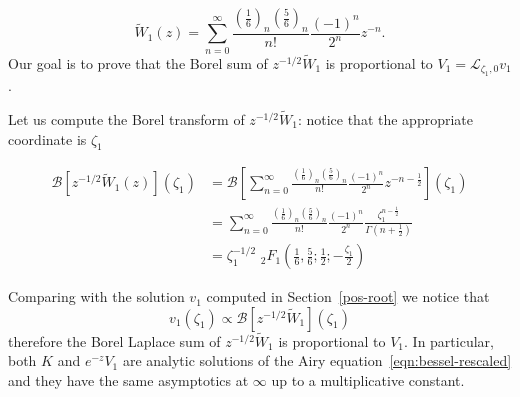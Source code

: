 \documentclass{article}
\theoremstyle{definition}
\newcommand{\laplace}{\mathcal{L}}
\newcommand{\borel}{\mathcal{B}}
\begin{document}
\begin{equation}
\tilde{W}_1(z)=\sum_{n=0}^{\infty}\frac{\left(\frac{1}{6}\right)_n\left(\frac{5}{6}\right)_n}{n!}\frac{(-1)^n}{2^n}z^{-n}.
\end{equation}
Our goal is to prove that the Borel sum of $z^{-1/2}\tilde{W}_1$ is proportional to $V_1=\laplace_{\zeta_1,0}v_1$. 
%
%
%
%

Let us compute the Borel transform of $z^{-1/2}\tilde{W}_1$: notice that the appropriate coordinate is $\zeta_1$ 

\begin{align*}
\borel\left[z^{-1/2}\tilde{W}_1(z)\right](\zeta_1)&=\borel\left[\sum_{n=0}^{\infty}\frac{\left(\frac{1}{6}\right)_n\left(\frac{5}{6}\right)_n}{n!}\frac{(-1)^n}{2^n}z^{-n-\frac{1}{2}} \right](\zeta_1)\\
&=\sum_{n=0}^{\infty}\frac{\left(\frac{1}{6}\right)_n\left(\frac{5}{6}\right)_n}{n!}\frac{(-1)^n}{2^n}\frac{\zeta_1^{n-\frac{1}{2}}}{\Gamma(n+\frac{1}{2})}\\
&=\zeta_1^{-1/2}\,\, {}_2F_1\left(\frac{1}{6},\frac{5}{6};\frac{1}{2};-\frac{\zeta_1}{2}\right)
\end{align*}

Comparing with the solution $v_1$ computed in Section~\ref{pos-root} we notice that \[v_1(\zeta_1)\propto \borel\left[z^{-1/2}\tilde{W}_1\right](\zeta_1)\]
therefore the Borel Laplace sum of $z^{-1/2}\tilde{W}_1$ is proportional to $V_1$. In particular, both $K$ and $e^{-z}V_1$ are analytic solutions of the Airy equation~\eqref{eqn:bessel-rescaled} and they have the same asymptotics at $\infty$ up to a multiplicative constant. 
\end{document}
